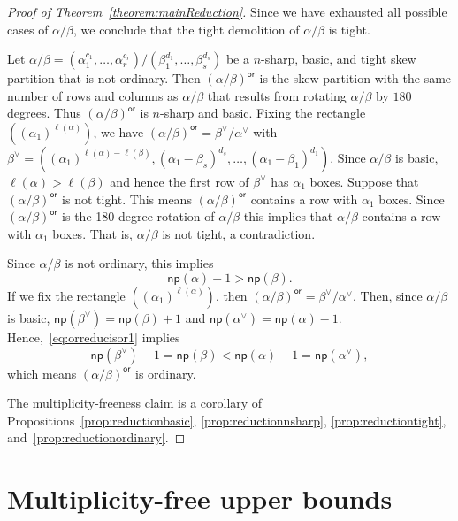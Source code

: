 \documentclass[ALCO,ThmDefs,Unicode,epreuves]{cedram}
\newcommand{\np}{\mathsf{np}}
\newcommand{\orsf}{\mathsf{or}}
\begin{document}
\begin{proof}[Proof of Theorem~\ref{theorem:mainReduction}]
Since we have exhausted all possible cases of $\alpha/\beta$, we conclude that the tight demolition of $\alpha/\beta$ is tight.

Let $\alpha / \beta = (\alpha_1^{c_1},\ldots,\alpha_r^{c_r}) / (\beta_1^{d_1},\ldots,\beta_s^{d_s})$ be a $n$-sharp, basic, and tight skew partition that is not ordinary. Then $(\alpha / \beta)^{\orsf}$ is the skew partition with the same number of rows and columns as $\alpha / \beta$ that results from rotating $\alpha / \beta$ by $180$ degrees. Thus $(\alpha / \beta)^{\orsf}$ is $n$-sharp and basic. Fixing the rectangle $((\alpha_1)^{\ell(\alpha)})$, we have $(\alpha / \beta)^{\orsf} = \beta^{\vee} / \alpha^{\vee}$ with $\beta^{\vee} = ((\alpha_1)^{\ell(\alpha) - \ell(\beta)},(\alpha_1-\beta_s)^{d_s},\ldots, (\alpha_1-\beta_1)^{d_1})$. Since $\alpha / \beta$ is basic, $\ell(\alpha) > \ell(\beta)$ and hence the first row of $\beta^{\vee}$ has $\alpha_1$ boxes. Suppose that $(\alpha / \beta)^{\orsf}$ is not tight. This means $(\alpha / \beta)^{\orsf}$ contains a row with $\alpha_1$ boxes. Since $(\alpha / \beta)^{\orsf}$ is the 180 degree rotation of $\alpha / \beta$ this implies that $\alpha / \beta$ contains a row with $\alpha_1$ boxes. That is, $\alpha / \beta$ is not tight, a contradiction.

Since $\alpha / \beta$ is not ordinary, this implies 
\begin{equation}
\label{eq:orreducisor1}
\np (\alpha) - 1 > \np (\beta).
\end{equation}
If we fix the rectangle $((\alpha_1)^{\ell(\alpha)})$, then $(\alpha / \beta)^{\orsf} = \beta^{\vee} / \alpha^{\vee}$. Then, since $\alpha / \beta$ is basic, $\np (\beta^{\vee}) = \np (\beta) + 1$ and $\np (\alpha^{\vee}) = \np (\alpha) - 1$. Hence,~\eqref{eq:orreducisor1} implies
\begin{equation}
\np (\beta^{\vee}) - 1 = \np (\beta) < \np (\alpha) - 1 = \np (\alpha^{\vee}),
\end{equation}
which means $(\alpha / \beta)^{\orsf}$ is ordinary.

The multiplicity-freeness claim is a corollary of Propositions~\ref{prop:reductionbasic}, \ref{prop:reductionnsharp}, \ref{prop:reductiontight}, and~\ref{prop:reductionordinary}.
\end{proof}


\section{Multiplicity-free upper bounds}
\end{document}
